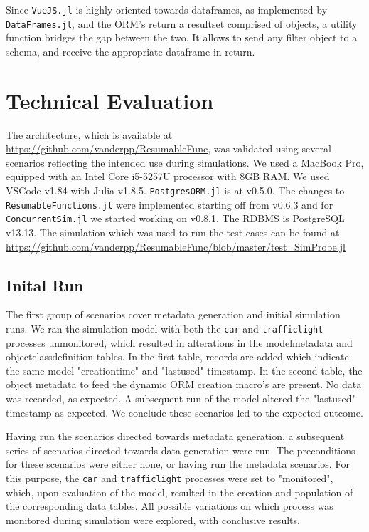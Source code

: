 \documentclass{juliacon}
\begin{document}
Since \texttt{VueJS.jl} is highly oriented towards dataframes, as implemented by \texttt{DataFrames.jl}, and the ORM's return a resultset comprised of objects, a utility function bridges the gap between the two. It allows to send any filter object to a schema, and receive the appropriate dataframe in return.\vskip 6pt

\section{Technical Evaluation}

The architecture, which is available at \url{https://github.com/vanderpp/ResumableFunc}, was validated using several scenarios reflecting the intended use during simulations. We used a MacBook Pro, equipped with an Intel Core i5-5257U processor with 8GB RAM. We used VSCode v1.84 with Julia v1.8.5. \texttt{PostgresORM.jl} is at v0.5.0. The changes to \texttt{ResumableFunctions.jl} were implemented starting off from v0.6.3 and for \texttt{ConcurrentSim.jl}  we started working on v0.8.1. The RDBMS is PostgreSQL v13.13. The simulation which was used to run the test cases can be found at \url{https://github.com/vanderpp/ResumableFunc/blob/master/test_SimProbe.jl}\vskip 6pt

\subsection{Inital Run}

The first group of scenarios cover metadata generation and initial simulation runs. We ran the simulation model with both the \texttt{car} and \texttt{trafficlight} processes unmonitored, which resulted in alterations in the modelmetadata and objectclassdefinition tables. In the first table, records are added which indicate the same model "creationtime" and "lastused" timestamp. In the second table, the object metadata to feed the dynamic ORM creation macro's are present. No data was recorded, as expected. A subsequent run of the model altered the "lastused" timestamp as expected. We conclude these scenarios led to the expected outcome. \vskip 6pt

Having run the scenarios directed towards metadata generation, a subsequent series of scenarios directed towards data generation were run. The preconditions for these scenarios were either none, or having run the metadata scenarios. For this purpose, the \texttt{car} and \texttt{trafficlight} processes were set to "monitored", which, upon evaluation of the model, resulted in the creation and population of the corresponding data tables. All possible variations on which process was monitored during simulation were explored, with conclusive results. \vskip 6pt
\end{document}
